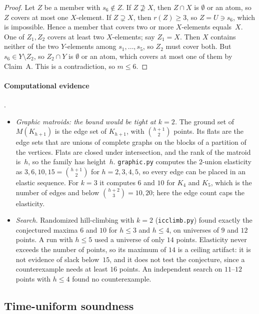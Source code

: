 \begin{proof}
Let $Z$ be a member with $s_6\notin Z$. If $Z\not\supseteq X$, then $Z\cap X$ is $\emptyset$ or an atom, so $Z$ covers at most one $X$-element. If $Z\supsetneq X$, then $r(Z)\ge3$, so $Z=U\ni s_6$, which is impossible. Hence a member that covers two or more $X$-elements equals~$X$. One of $Z_1,Z_2$ covers at least two $X$-elements; say $Z_1=X$. Then $X$ contains neither of the two $Y$-elements among $s_1,\dots,s_5$, so $Z_2$ must cover both. But $s_6\in Y\setminus Z_2$, so $Z_2\cap Y$ is $\emptyset$ or an atom, which covers at most one of them by Claim~A. This is a contradiction, so $m\le6$.
\end{proof}

\paragraph{Computational evidence} .
\begin{itemize}
\item \emph{Graphic matroids: the bound would be tight at $k=2$.} The ground set of $M(K_{h+1})$ is the edge set of $K_{h+1}$, with $\binom{h+1}2$ points. Its flats are the edge sets that are unions of complete graphs on the blocks of a partition of the vertices. Flats are closed under intersection, and the rank of the matroid is~$h$, so the family has height~$h$. \texttt{graphic.py} computes the $2$-union elasticity as $3,6,10,15=\binom{h+1}2$ for $h=2,3,4,5$, so every edge can be placed in an elastic sequence. For $k=3$ it computes $6$ and $10$ for $K_4$ and $K_5$, which is the number of edges and below $\binom{h+2}3=10,20$; here the edge count caps the elasticity.
\item \emph{Search.} Randomized hill-climbing with $k=2$ (\texttt{icclimb.py}) found exactly the conjectured maxima $6$ and $10$ for $h\le3$ and $h\le4$, on universes of $9$ and $12$ points. A run with $h\le5$ used a universe of only $14$ points. Elasticity never exceeds the number of points, so its maximum of $14$ is a ceiling artifact: it is not evidence of slack below~$15$, and it does not test the conjecture, since a counterexample needs at least $16$ points. An independent search on $11$--$12$ points with $h\le4$ found no counterexample.
\end{itemize}

\subsection{Time-uniform soundness}\label{app:caution:ville}

